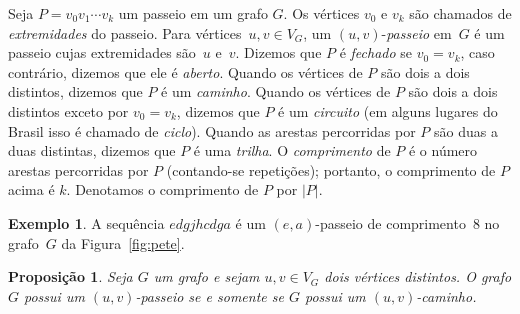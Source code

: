 \documentclass[12pt, a4paper]{article}
\newtheorem{prop}[teor]{Proposição}
\theoremstyle{definition}
\newtheorem{exem}[teor]{Exemplo}
\begin{document}
Seja $P = v_0v_1 \cdots v_k$ um passeio em um grafo $G$. Os vértices $v_0$ e $v_k$ são chamados de \emph{extremidades} do passeio. Para vértices~$u,v \in V_G$, um $(u,v)$-\textit{passeio} em~$G$ é um passeio cujas extremidades são~$u$ e~$v$. Dizemos que $P$ é \emph{fechado} se $v_0 = v_k$, caso contrário, dizemos que ele é \emph{aberto}. Quando os vértices de $P$ são dois a dois distintos, dizemos que $P$ é um \emph{caminho}. Quando os vértices de $P$ são dois a dois distintos exceto por $v_0 = v_k$, dizemos que $P$ é um \emph{circuito} (em alguns lugares do Brasil isso é chamado de \emph{ciclo}). Quando as arestas percorridas por $P$ são duas a duas distintas, dizemos que $P$ é uma \emph{trilha}. O \emph{comprimento} de $P$ é o número arestas percorridas por $P$ (contando-se repetições); portanto, o comprimento de $P$ acima é $k$. Denotamos o comprimento de $P$ por $|P|$.

\begin{exem}
\label{exem:walk}
A sequência $edgjhcdga$ é um $(e,a)$-passeio de comprimen\-to~$8$ no grafo~$G$ da Figura~\ref{fig:pete}.
\end{exem}

\begin{prop}
Seja $G$ um grafo e sejam $u,v \in V_G$ dois vértices distintos. O grafo $G$ possui um $(u,v)$-passeio se e somente se $G$ possui um $(u,v)$-caminho.
\end{prop}
\end{document}
